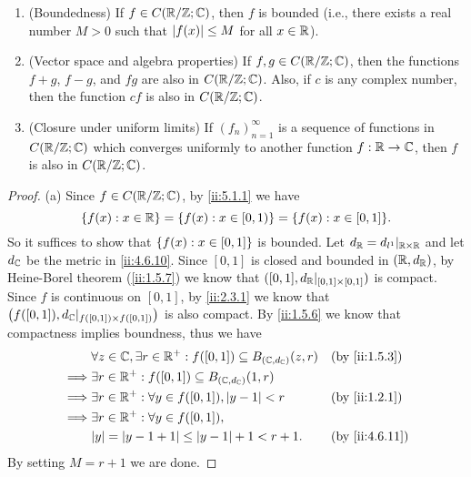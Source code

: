 \begin{lem}\label{ii:5.1.5}
  \quad
  \begin{enumerate}
    \item (Boundedness)
          If \(f \in C(\mathbb{R} / \mathbb{Z} ; \mathbb{C})\), then \(f\) is bounded
          (i.e., there exists a real number \(M > 0\) such that \(\left\lvert f(x)\right\rvert \leq M\) for all \(x \in \mathbb{R}\)).
    \item (Vector space and algebra properties)
          If \(f, g \in C(\mathbb{R} / \mathbb{Z} ; \mathbb{C})\), then the functions \(f + g\), \(f - g\), and \(f g\) are also in \(C(\mathbb{R} / \mathbb{Z} ; \mathbb{C})\).
          Also, if \(c\) is any complex number, then the function \(cf\) is also in \(C(\mathbb{R} / \mathbb{Z} ; \mathbb{C})\).
    \item (Closure under uniform limits)
          If \((f_n)_{n = 1}^\infty\) is a sequence of functions in \(C(\mathbb{R} / \mathbb{Z} ; \mathbb{C})\) which converges uniformly to another function \(f : \mathbb{R} \to \mathbb{C}\), then \(f\) is also in \(C(\mathbb{R} / \mathbb{Z} ; \mathbb{C})\).
  \end{enumerate}
\end{lem}

\begin{proof}{(a)}
  Since \(f \in C(\mathbb{R} / \mathbb{Z} ; \mathbb{C})\), by \cref{ii:5.1.1} we have
  \[
    \set{f(x) : x \in \R} = \set{f(x) : x \in [0, 1)} = \set{f(x) : x \in [0, 1]}.
  \]
  So it suffices to show that \(\left\lbrace f(x) : x \in [0, 1]\right\rbrace\) is bounded.
  Let \(d_{\mathbb{R}} = d_{l^1}|_{\mathbb{R} \times \mathbb{R}}\) and let \(d_{\mathbb{C}}\) be the metric in \cref{ii:4.6.10}.
  Since \([0, 1]\) is closed and bounded in \((\mathbb{R}, d_{\mathbb{R}})\), by Heine-Borel theorem (\cref{ii:1.5.7}) we know that \(([0, 1], d_{\mathbb{R}}|_{[0, 1] \times [0, 1]})\) is compact.
  Since \(f\) is continuous on \([0, 1]\), by \cref{ii:2.3.1} we know that \(\big(f([0, 1]), d_{\mathbb{C}}|_{f([0, 1]) \times f([0, 1])}\big)\) is also compact.
  By \cref{ii:1.5.6} we know that compactness implies boundness, thus we have
  \begin{align*}
             & \forall z \in \C, \exists r \in \R^+ : f([0, 1]) \subseteq B_{(\C, d_{\C})}(z, r) &  & \by{ii:1.5.3}  \\
    \implies & \exists r \in \R^+ : f([0, 1]) \subseteq B_{(\C, d_{\C})}(1, r)                                    \\
    \implies & \exists r \in \R^+ : \forall y \in f([0, 1]), \abs{y - 1} < r                     &  & \by{ii:1.2.1}  \\
    \implies & \exists r \in \R^+ : \forall y \in f([0, 1]),                                                      \\
             & \abs{y} = \abs{y - 1 + 1} \leq \abs{y - 1} + 1 < r + 1.                           &  & \by{ii:4.6.11}
  \end{align*}
  By setting \(M = r + 1\) we are done.
\end{proof}

